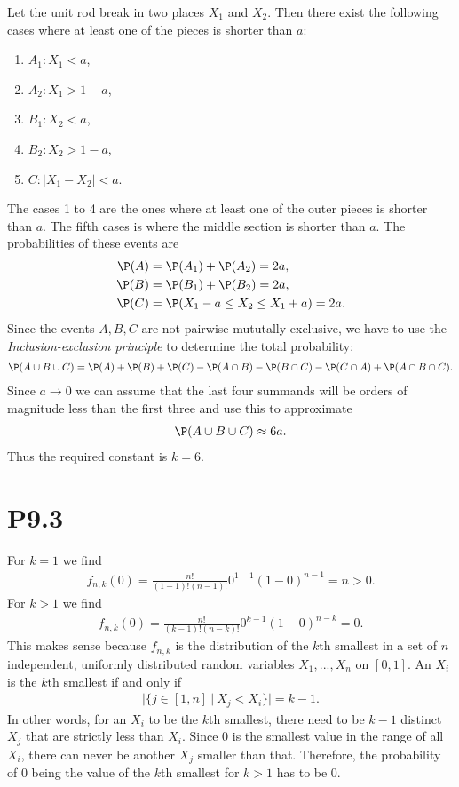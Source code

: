 \documentclass{article}
\begin{document}
Let the unit rod break in two places $X_1$ and $X_2$. Then there
exist the following cases where at least one of the pieces is shorter
than $a$:
\begin{enumerate}
  \item $A_1:X_1<a$,
  \item $A_2:X_1>1-a$,
  \item $B_1:X_2<a$,
  \item $B_2:X_2>1-a$,
  \item $C:|X_1-X_2|<a$.
\end{enumerate}
The cases 1 to 4 are the ones where at least one of the outer
pieces is shorter than $a$. The fifth cases is where the middle section 
is shorter than $a$. The probabilities of these events are
\begin{align*}
  \P(A) &= \P(A_1) + \P(A_2) = 2a,\\
  \P(B) &= \P(B_1) + \P(B_2) = 2a,\\
  \P(C) &= \P(X_1-a\leq X_2 \leq X_1+a) = 2a.
\end{align*}
Since the events $A,B,C$ are not pairwise mututally exclusive,
we have to use the \emph{Inclusion-exclusion principle}
to determine the total probability:
\begin{align*}
  \P(A\cup B\cup C) = \P(A) + \P(B) + \P(C) - \P(A \cap B) - \P(B\cap C) - \P(C\cap A) + \P(A\cap B\cap C).
\end{align*}
Since $a\to 0$ we can assume that the last four summands will be
orders of magnitude less than the first three and use this to approximate
\begin{align*}
  \P(A\cup B\cup C) \approx 6a.
\end{align*}
Thus the required constant is $k=6$.

\section*{P9.3}

For $k=1$ we find
\begin{align*}
  f_{n,k}(0) = \frac{n!}{(1-1)!(n-1)!}0^{1-1}(1-0)^{n-1} = n > 0.
\end{align*}
For $k>1$ we find
\begin{align*}
  f_{n,k}(0) = \frac{n!}{(k-1)!(n-k)!}0^{k-1}(1-0)^{n-k} = 0.
\end{align*}
This makes sense because $f_{n,k}$ is the distribution of 
the $k$th smallest in a set of $n$ independent, uniformly distributed
random variables $X_1, ..., X_n$ on $[0,1]$. 
An $X_i$ is the $k$th smallest if and only if 
\begin{align*}
  |\{j \in [1,n]\:|\: X_j < X_i\}| = k-1.
\end{align*} In other words, for an $X_i$ to be
the $k$th smallest, there need to be $k-1$ distinct $X_j$ that are strictly 
less than $X_i$. Since $0$ is the smallest value in the range of
all $X_i$, there can never be another $X_j$ smaller than that.
Therefore, the probability of $0$ being the value of the $k$th smallest
for $k>1$ has to be $0$.
\end{document}
